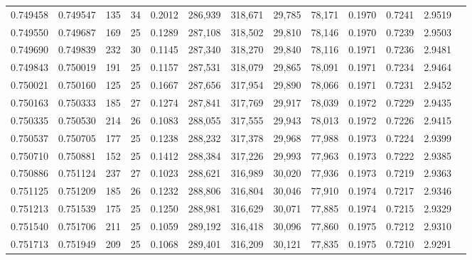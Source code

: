 \begin{tabular}{rrrrrrrrrrrrr}
0.749458 & 0.749547 &   135 &  34 &                                     0.2012 & 286,939 & 318,671 &  29,785 &  78,171 & 0.1970 & 0.7241 & 2.9519 \\
0.749550 & 0.749687 &   169 &  25 &                                     0.1289 & 287,108 & 318,502 &  29,810 &  78,146 & 0.1970 & 0.7239 & 2.9503 \\
0.749690 & 0.749839 &   232 &  30 &                                     0.1145 & 287,340 & 318,270 &  29,840 &  78,116 & 0.1971 & 0.7236 & 2.9481 \\
0.749843 & 0.750019 &   191 &  25 &                                     0.1157 & 287,531 & 318,079 &  29,865 &  78,091 & 0.1971 & 0.7234 & 2.9464 \\
0.750021 & 0.750160 &   125 &  25 &                                     0.1667 & 287,656 & 317,954 &  29,890 &  78,066 & 0.1971 & 0.7231 & 2.9452 \\
0.750163 & 0.750333 &   185 &  27 &                                     0.1274 & 287,841 & 317,769 &  29,917 &  78,039 & 0.1972 & 0.7229 & 2.9435 \\
0.750335 & 0.750530 &   214 &  26 &                                     0.1083 & 288,055 & 317,555 &  29,943 &  78,013 & 0.1972 & 0.7226 & 2.9415 \\
0.750537 & 0.750705 &   177 &  25 &                                     0.1238 & 288,232 & 317,378 &  29,968 &  77,988 & 0.1973 & 0.7224 & 2.9399 \\
0.750710 & 0.750881 &   152 &  25 &                                     0.1412 & 288,384 & 317,226 &  29,993 &  77,963 & 0.1973 & 0.7222 & 2.9385 \\
0.750886 & 0.751124 &   237 &  27 &                                     0.1023 & 288,621 & 316,989 &  30,020 &  77,936 & 0.1973 & 0.7219 & 2.9363 \\
0.751125 & 0.751209 &   185 &  26 &                                     0.1232 & 288,806 & 316,804 &  30,046 &  77,910 & 0.1974 & 0.7217 & 2.9346 \\
0.751213 & 0.751539 &   175 &  25 &                                     0.1250 & 288,981 & 316,629 &  30,071 &  77,885 & 0.1974 & 0.7215 & 2.9329 \\
0.751540 & 0.751706 &   211 &  25 &                                     0.1059 & 289,192 & 316,418 &  30,096 &  77,860 & 0.1975 & 0.7212 & 2.9310 \\
0.751713 & 0.751949 &   209 &  25 &                                     0.1068 & 289,401 & 316,209 &  30,121 &  77,835 & 0.1975 & 0.7210 & 2.9291 \\

\end{tabular}
